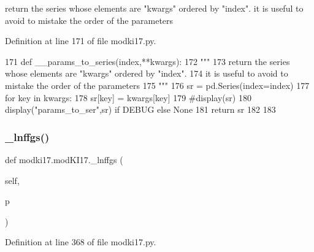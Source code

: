 \begin{DoxyVerb}return the series whose elements are "kwargs" ordered by "index".
it is useful to avoid to mistake the order of the parameters
\end{DoxyVerb}
 

Definition at line 171 of file modki17.\+py.


\begin{DoxyCode}
171     \textcolor{keyword}{def }\_\_params\_to\_series(index,**kwargs):
172         \textcolor{stringliteral}{"""}
173 \textcolor{stringliteral}{        return the series whose elements are "kwargs" ordered by "index".}
174 \textcolor{stringliteral}{        it is useful to avoid to mistake the order of the parameters}
175 \textcolor{stringliteral}{        """}
176         sr = pd.Series(index=index)
177         \textcolor{keywordflow}{for} key \textcolor{keywordflow}{in} kwargs:
178             sr[key] = kwargs[key]
179             \textcolor{comment}{#display(sr)}
180         display(\textcolor{stringliteral}{"params\_to\_ser"},sr) \textcolor{keywordflow}{if} DEBUG \textcolor{keywordflow}{else} \textcolor{keywordtype}{None}
181         \textcolor{keywordflow}{return} sr
182     
183     
\end{DoxyCode}
\mbox{\label{classmodki17_1_1modKI17_ac4f7ff6b06910b39762b7e4cdddd9063}} 
\subsubsection{\texorpdfstring{\+\_\+lnffgs()}{\_lnffgs()}}
{\footnotesize\ttfamily def modki17.\+mod\+K\+I17.\+\_\+lnffgs (\begin{DoxyParamCaption}\item[{}]{self,  }\item[{}]{p }\end{DoxyParamCaption})\hspace{0.3cm}{\ttfamily [private]}}



Definition at line 368 of file modki17.\+py.


